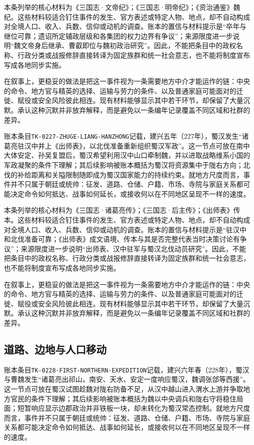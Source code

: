 本条列举的核心材料为《三国志·文帝纪》；《三国志·明帝纪》；《资治通鉴》魏纪。这些材料较适合钉住事件的发生、官方表述或特定人物、地点，却不自动构成对全境人口、收入、兵数、信仰或动机的调查。账本的置信与材料提示是“卒年与继位可靠；遗诏所定辅政层级和各集团的权力边界有争议”；来源限度进一步说明“魏文帝身后继承、曹叡即位与魏初政治研究”。因此，不能把条目中的政权名称、行政分类或战报修辞直接转译为固定族群和统一社会意志，也不能将制度宣布写成各地同步实施。

在叙事上，更稳妥的做法是把这一事件视为一条需要地方中介才能运作的链：中央的命令、地方官与精英的选择、运输与劳力的条件、以及普通家庭可能面对的迁徙、赋役或安全风险彼此相连。现有材料能够显示其中若干环节，却保留了大量沉默。承认这种沉默并非放弃解释，而是避免以一条编年记录覆盖不同区域和社群的差异。

账本条目\texttt{TK-0227-ZHUGE-LIANG-HANZHONG}记载，建兴五年（227年），蜀汉发生“诸葛亮驻汉中并上《出师表》，以北伐准备重新组织蜀汉军政”。这一节点可放在南中大体安定、孙吴复盟后，蜀汉希望利用汉中山口牵制魏，并以进取战略维系小国的军政凝聚的条件下理解；其后续影响被账本概括为蜀汉将资源集中于陇右方向；北伐的补给距离和关隘限制随即成为蜀汉国家能力的持续约束。就地方尺度而言，事件并不只属于朝廷或统帅：征发、道路、仓储、户籍、市场、寺院与家庭关系都可能决定命令如何抵达、战事如何延长，或接收何以在不同地区呈现不一样的速度。

本条列举的核心材料为《三国志·诸葛亮传》；《三国志·后主传》；《出师表》传本。这些材料较适合钉住事件的发生、官方表述或特定人物、地点，却不自动构成对全境人口、收入、兵数、信仰或动机的调查。账本的置信与材料提示是“驻汉中和北伐准备可靠；《出师表》成文语境、传本与其是否完整代表当时决策讨论有争议”；来源限度进一步说明“出师表、汉中驻军与蜀汉北伐动员研究”。因此，不能把条目中的政权名称、行政分类或战报修辞直接转译为固定族群和统一社会意志，也不能将制度宣布写成各地同步实施。

在叙事上，更稳妥的做法是把这一事件视为一条需要地方中介才能运作的链：中央的命令、地方官与精英的选择、运输与劳力的条件、以及普通家庭可能面对的迁徙、赋役或安全风险彼此相连。现有材料能够显示其中若干环节，却保留了大量沉默。承认这种沉默并非放弃解释，而是避免以一条编年记录覆盖不同区域和社群的差异。

\subsection{道路、边地与人口移动}

账本条目\texttt{TK-0228-FIRST-NORTHERN-EXPEDITION}记载，建兴六年春（228年），蜀汉与曹魏发生“诸葛亮出祁山，南安、天水、安定一度响应蜀汉，魏调张郃等西援”。这一节点可放在蜀汉试图趁魏对陇右防备不足，从汉中越山进入渭水上游并争取地方官民的条件下理解；其后续影响被账本概括为魏以中央调兵和陇右守将稳住局面；短暂响应显示边郡政治并非铁板一块，却未转化为蜀汉常态控制。就地方尺度而言，事件并不只属于朝廷或统帅：征发、道路、仓储、户籍、市场、寺院与家庭关系都可能决定命令如何抵达、战事如何延长，或接收何以在不同地区呈现不一样的速度。

